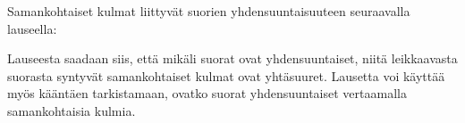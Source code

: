Samankohtaiset kulmat liittyvät suorien yhdensuuntaisuuteen seuraavalla lauseella:

Lauseesta saadaan siis, että mikäli suorat ovat yhdensuuntaiset, niitä leikkaavasta suorasta syntyvät samankohtaiset kulmat ovat yhtäsuuret. Lausetta voi käyttää myös kääntäen tarkistamaan, ovatko suorat yhdensuuntaiset vertaamalla samankohtaisia kulmia.
